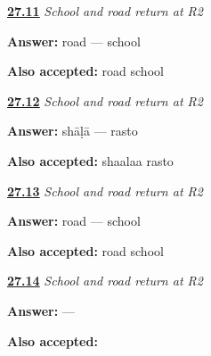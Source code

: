 \noindent\begin{minipage}[t]{\linewidth}
\raggedright
\hyperlink{review-GU-R23-shaalaa-rasto-r2-listening}{\textbf{27.11}} \emph{School and road return at R2}\par
\small \textbf{Answer:} road — school\par
\footnotesize \textbf{Also accepted:} road school
\end{minipage}\par\medskip

\noindent\begin{minipage}[t]{\linewidth}
\raggedright
\hyperlink{review-GU-R23-shaalaa-rasto-r2-speaking}{\textbf{27.12}} \emph{School and road return at R2}\par
\small \textbf{Answer:} shāḷā — rasto\par
\footnotesize \textbf{Also accepted:} shaalaa rasto
\end{minipage}\par\medskip

\noindent\begin{minipage}[t]{\linewidth}
\raggedright
\hyperlink{review-GU-R23-shaalaa-rasto-r2-reading}{\textbf{27.13}} \emph{School and road return at R2}\par
\small \textbf{Answer:} road — school\par
\footnotesize \textbf{Also accepted:} road school
\end{minipage}\par\medskip

\noindent\begin{minipage}[t]{\linewidth}
\raggedright
\hyperlink{review-GU-R23-shaalaa-rasto-r2-writing}{\textbf{27.14}} \emph{School and road return at R2}\par
\small \textbf{Answer:}  — \par
\footnotesize \textbf{Also accepted:}  
\end{minipage}\par\medskip
